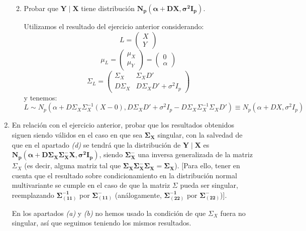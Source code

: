 \documentclass[11pt,a4paper]{article}
\begin{document}
\begin{enumerate}[label=\arabic*.]
\begin{enumerate}[label=\alph*)]
\vspace{1cm}
\bfseries
\item Probar que $\mathbf{Y \mid X}$ tiene distribución $\mathbf{N_{p}(\alpha + DX, \sigma^{2}I_{p})}$.
\vspace{0.5cm}
\normalfont

Utilizamos el resultado del ejercicio anterior considerando:
$$L = \begin{pmatrix} X \\ Y \end{pmatrix}$$
$$\mu_{L} = \begin{pmatrix} \mu_{X} \\ \mu_{Y} \end{pmatrix} = \begin{pmatrix} 0 \\ \alpha \end{pmatrix}$$
$$\Sigma_{L} = \begin{pmatrix}
\Sigma_{X} & \Sigma_{X}D' \\
D\Sigma_{X} & D\Sigma_{X}D' + \sigma^{2}I_{p}
\end{pmatrix}$$
y tenemos:
$$L \sim N_{p} (\alpha + D\Sigma_{X}\Sigma_{X}^{-1}(X-0), D\Sigma_{X}D' + \sigma^{2}I_{p} - D\Sigma_{X}\Sigma_{X}^{-1}\Sigma_{X}D') \equiv N_{p}(\alpha + DX, \sigma^{2}I_{p})$$
\end{enumerate}

\newpage
\bfseries
\item En relación con el ejercicio anterior, probar que los resultados obtenidos siguen siendo válidos en el caso en que sea $\mathbf{\Sigma_{X}}$ singular, con la salvedad de que en el apartado \emph{(d)} se tendrá que la distribución de $\mathbf{Y \mid X}$ es $\mathbf{N_{p}(\alpha + D\Sigma_{X}\Sigma_{X}^{-}X, \sigma^{2}I_{p})}$, siendo $\mathbf{\Sigma_{X}^{-}}$ una inversa generalizada de la matriz $\Sigma_{X}$ (es decir, alguna matriz tal que $\mathbf{\Sigma_{X}\Sigma_{X}^{-}\Sigma_{X} = \Sigma_{X}}$). [Para ello, tener en cuenta que el resultado sobre condicionamiento en la distribución normal multivariante se cumple en el caso de que la matriz $\Sigma$ pueda ser singular, reemplazando $\mathbf{\Sigma_{(11)}^{-1}}$ por $\mathbf{\Sigma_{(11)}^{-}}$ (análogamente, $\mathbf{\Sigma_{(22)}^{-1}}$ por $\mathbf{\Sigma_{(22)}^{-}}$)].
\vspace{0.5cm}
\normalfont

En los apartados \emph{(a)} y \emph{(b)} no hemos usado la condición de que $\Sigma_{X}$ fuera no singular, así que seguimos teniendo los mismos resultados.


\end{enumerate}
\end{document}
